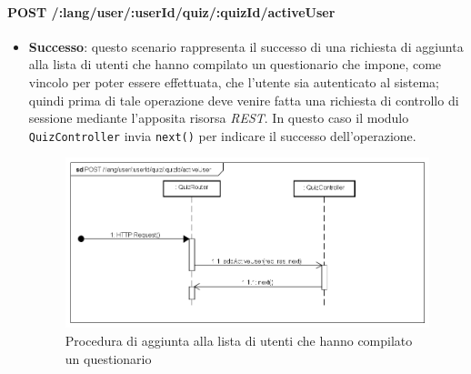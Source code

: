 \paragraph{POST /:lang/user/:userId/quiz/:quizId/activeUser} %
\begin{itemize}
\item \textbf{Successo}: questo scenario rappresenta il successo di una richiesta di aggiunta alla lista di utenti che hanno compilato un questionario che impone, come vincolo per poter essere effettuata, che l'utente sia autenticato al sistema; quindi prima di tale operazione deve venire fatta una richiesta di controllo di sessione mediante l'apposita risorsa \textit{REST}. In questo caso il modulo \texttt{QuizController} invia \texttt{next()} per indicare il successo dell'operazione.
\label{Procedura di aggiunta alla lista di utenti che hanno compilato un questionario}
\begin{figure}[ht]
	\centering
	\includegraphics[scale=0.50]{UML/DiagrammiDiSequenza/Back-end/POST__lang_user_userId_quiz_quizId_activeUser_success.png}
	\caption{Procedura di aggiunta alla lista di utenti che hanno compilato un questionario}
\end{figure}
\FloatBarrier


\end{itemize}
